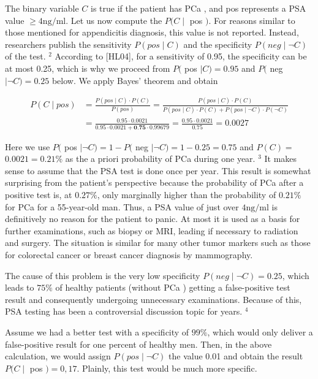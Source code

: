 \documentclass[10pt]{book}
\begin{document}
\begin{center}
\begin{enumerate}
The binary variable $C$ is true if the patient has PCa , and pos represents a PSA value $\geq 4 \mathrm{ng} / \mathrm{ml}$. Let us now compute the $P(C \mid$ pos $)$. For reasons similar to those mentioned for appendicitis diagnosis, this value is not reported. Instead, researchers publish the sensitivity $P(p o s \mid C)$ and the specificity $P(n e g \mid \neg C)$ of the test. ${ }^{2}$ According to [HL04], for a sensitivity of 0.95, the specificity can be at most 0.25, which is why we proceed from $P($ pos $\mid C)=0.95$ and $P($ neg $\mid \neg C)=0.25$ below. We apply Bayes' theorem and obtain


$$
\begin{aligned}
P(C \mid p o s) & =\frac{P(p o s \mid C) \cdot P(C)}{P(p o s)}=\frac{P(p o s \mid C) \cdot P(C)}{P(p o s \mid C) \cdot P(C)+P(p o s \mid \neg C) \cdot P(\neg C)} \\
& =\frac{0.95 \cdot 0.0021}{0.95 \cdot 0.0021+\mathbf{0 . 7 5} \cdot 0.99679}=\frac{0.95 \cdot 0.0021}{0.75}=0.0027
\end{aligned}
$$

Here we use $P($ pos $\mid \neg C)=1-P($ neg $\mid \neg C)=1-0.25=0.75$ and $P(C)=$ $0.0021=0.21 \%$ as the a priori probability of PCa during one year. ${ }^{3}$ It makes sense to assume that the PSA test is done once per year. This result is somewhat surprising from the patient's perspective because the probability of PCa after a positive test is, at $0.27 \%$, only marginally higher than the probability of $0.21 \%$ for PCa for a 55-year-old man. Thus, a PSA value of just over $4 \mathrm{ng} / \mathrm{ml}$ is definitively no reason for the patient to panic. At most it is used as a basis for further examinations, such as biopsy or MRI, leading if necessary to radiation and surgery. The situation is similar for many other tumor markers such as those for colorectal cancer or breast cancer diagnosis by mammography.

The cause of this problem is the very low specificity $P(n e g \mid \neg C)=0.25$, which leads to $75 \%$ of healthy patients (without PCa ) getting a false-positive test result and consequently undergoing unnecessary examinations. Because of this, PSA testing has been a controversial discussion topic for years. ${ }^{4}$

Assume we had a better test with a specificity of $99 \%$, which would only deliver a false-positive result for one percent of healthy men. Then, in the above calculation, we would assign $P(p o s \mid \neg C)$ the value 0.01 and obtain the result $P(C \mid$ pos $)=0,17$. Plainly, this test would be much more specific.


\end{enumerate}
\end{center}
\end{document}
